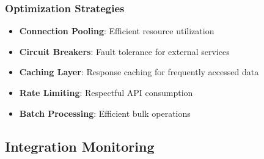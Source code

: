 \subsubsection{Optimization Strategies}

\begin{itemize}
    \item \textbf{Connection Pooling}: Efficient resource utilization
    \item \textbf{Circuit Breakers}: Fault tolerance for external services
    \item \textbf{Caching Layer}: Response caching for frequently accessed data
    \item \textbf{Rate Limiting}: Respectful API consumption
    \item \textbf{Batch Processing}: Efficient bulk operations
\end{itemize}

\subsection{Integration Monitoring}

